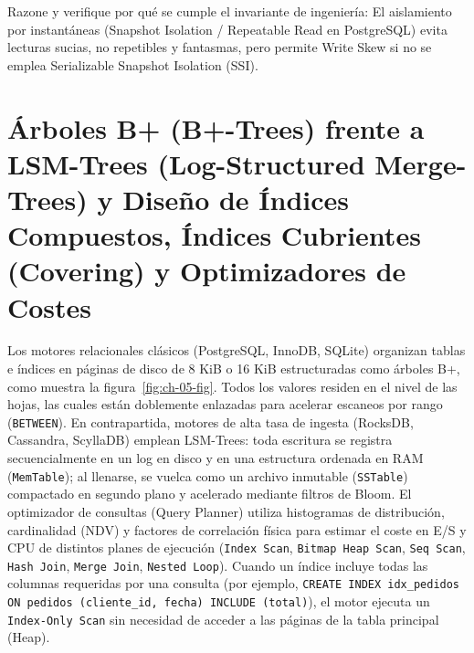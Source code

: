 \documentclass{book}
\begin{document}
\begin{tcolorbox}[title={Autoficha}, studiumcheck, breakable]

Razone y verifique por qué se cumple el invariante de ingeniería: El aislamiento por instantáneas (Snapshot Isolation / Repeatable Read en PostgreSQL) evita lecturas sucias, no repetibles y fantasmas, pero permite Write Skew si no se emplea Serializable Snapshot Isolation (SSI).
\end{tcolorbox}

\section{Árboles B+ (B+-Trees) frente a LSM-Trees (Log-Structured Merge-Trees) y Diseño de Índices Compuestos, Índices Cubrientes (Covering) y Optimizadores de Costes}

Los motores relacionales clásicos (PostgreSQL, InnoDB, SQLite) organizan tablas e índices en páginas de disco de 8 KiB o 16 KiB estructuradas como árboles B+, como muestra la figura~\ref{fig:ch-05-fig}. Todos los valores residen en el nivel de las hojas, las cuales están doblemente enlazadas para acelerar escaneos por rango (\texttt{BETWEEN}). En contrapartida, motores de alta tasa de ingesta (RocksDB, Cassandra, ScyllaDB) emplean LSM-Trees: toda escritura se registra secuencialmente en un log en disco y en una estructura ordenada en RAM (\texttt{MemTable}); al llenarse, se vuelca como un archivo inmutable (\texttt{SSTable}) compactado en segundo plano y acelerado mediante filtros de Bloom.
El optimizador de consultas (Query Planner) utiliza histogramas de distribución, cardinalidad (NDV) y factores de correlación física para estimar el coste en E/S y CPU de distintos planes de ejecución (\texttt{Index Scan}, \texttt{Bitmap Heap Scan}, \texttt{Seq Scan}, \texttt{Hash Join}, \texttt{Merge Join}, \texttt{Nested Loop}). Cuando un índice incluye todas las columnas requeridas por una consulta (por ejemplo, \texttt{CREATE INDEX idx\_pedidos ON pedidos (cliente\_id, fecha) INCLUDE (total)}), el motor ejecuta un \texttt{Index-Only Scan} sin necesidad de acceder a las páginas de la tabla principal (Heap).
\end{document}
